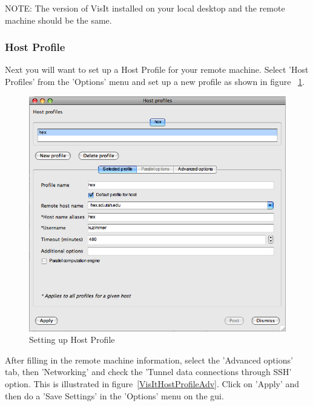 \documentclass[12pt]{article}
\begin{document}
NOTE: The version of VisIt installed on your local desktop and the
remote machine should be the same.

\subsubsection{Host Profile}
Next you will want to set up a Host Profile for your remote
machine. Select 'Host Profiles' from the 'Options' menu and set up a
new profile as shown in figure ~\ref{VisItHostProfile}.


\begin{figure}

  \vspace{-30pt}
  \begin{center}
    \includegraphics[width=.425\textwidth]{VisItHostProfile.png}
  \end{center}
  \vspace{-20pt}
  \caption{Setting up Host Profile}
  \vspace{-10pt}
  \label{VisItHostProfile}

\end{figure}


After filling in the remote machine information, select the 'Advanced
options' tab, then 'Networking' and check the 'Tunnel data connections
through SSH' option. This is illustrated in
figure~\ref{VisItHostProfileAdv}. Click on 'Apply' and then do a 'Save
Settings' in the 'Options' menu on the gui.
\end{document}
